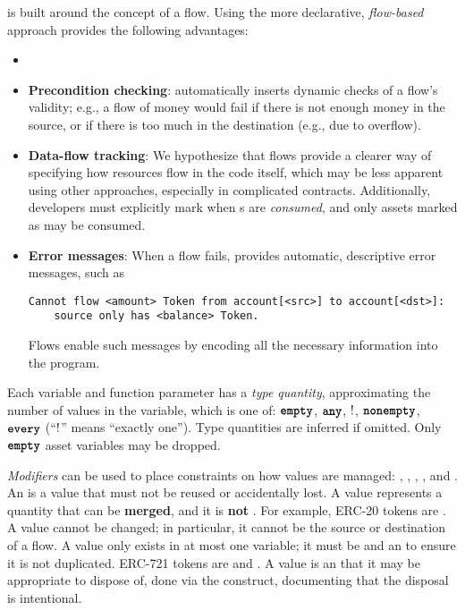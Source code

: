 \documentclass[nonacm, dvipsnames, sigconf]{acmart}
\begin{document}
\langName is built around the concept of a flow.
Using the more declarative, \emph{flow-based} approach provides the following advantages:
\begin{itemize}
    \item {}
    \item \textbf{Precondition checking}: \langName automatically inserts dynamic checks of a flow's validity; e.g., a flow of money would fail if there is not enough money in the source, or if there is too much in the destination (e.g., due to overflow).
    \item \textbf{Data-flow tracking}: We hypothesize that flows provide a clearer way of specifying how resources flow in the code itself, which may be less apparent using other approaches, especially in complicated contracts.
        Additionally, developers must explicitly mark when \assetTxt{}s are \emph{consumed}, and only assets marked as  may be consumed.
    \item \textbf{Error messages}: When a flow fails, \langName provides automatic, descriptive error messages, such as
\begin{lstlisting}[numbers=none, basicstyle=\small\ttfamily, xleftmargin=-5.0ex]
Cannot flow <amount> Token from account[<src>] to account[<dst>]:
    source only has <balance> Token.
\end{lstlisting}
        Flows enable such messages by encoding all the necessary information into the program.
\end{itemize}

Each variable and function parameter has a \emph{type quantity}, approximating the number of values in the variable, which is one of: $\textbf{\texttt{empty}}$, $\textbf{\texttt{any}}$, $!$, $\textbf{\texttt{nonempty}}$, $\textbf{\texttt{every}}$ (``$!$'' means ``exactly one'').
Type quantities are inferred if omitted.
Only $\textbf{\texttt{empty}}$ asset variables may be dropped.

\emph{Modifiers} can be used to place constraints on how values are managed: , , , , and .
An  is a value that must not be reused or accidentally lost.
A  value represents a quantity that can be \textbf{merged}, and it is \textbf{not} .
For example, ERC-20 tokens are .
A  value cannot be changed; in particular, it cannot be the source or destination of a flow.
A  value only exists in at most one variable; it must be  and an  to ensure it is not duplicated.
ERC-721 tokens are  and .
A  value is an  that it may be appropriate to dispose of, done via the  construct, documenting that the disposal is intentional.
\end{document}
